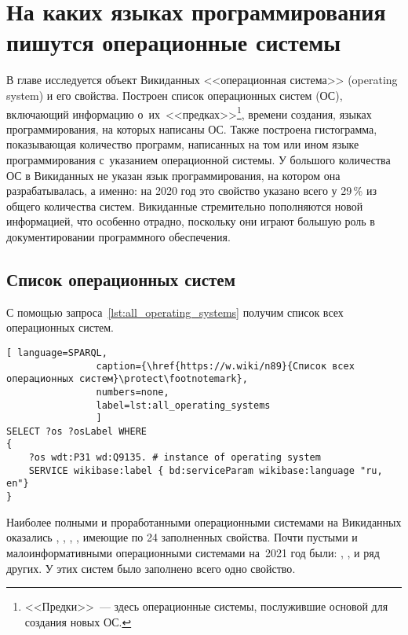 \chapter{На каких языках программирования пишутся операционные системы}
\label{ch:operating-sysmets}

В главе исследуется объект Викиданных <<операционная система>> (operating system) и его свойства. 
Построен список операционных систем (ОС), включающий информацию о~их~<<предках>>\footnote{%
%
<<Предки>>~--- здесь операционные системы, послужившие основой для создания новых ОС.%
%
}, 
времени создания, языках программирования, на которых написаны ОС. 
Также построена гистограмма, показывающая количество программ, 
написанных на том или ином языке программирования с~указанием операционной системы. 
У большого количества ОС в Викиданных не указан язык программирования, 
на котором она разрабатывалась, а именно: 
на 2020 год это свойство указано всего у 29\,\% из общего количества систем. 
Викиданные стремительно пополняются новой информацией, что особенно отрадно, 
поскольку они играют большую роль в документировании программного обеспечения.



\section{Список операционных систем}
С помощью запроса~\ref{lst:all_operating_systems} получим список всех операционных систем.
\begin{lstlisting}[ language=SPARQL, 
                caption={\href{https://w.wiki/n89}{Список всех операционных систем}\protect\footnotemark},
                numbers=none,
                label=lst:all_operating_systems
	            ]
SELECT ?os ?osLabel WHERE
{
    ?os wdt:P31 wd:Q9135. # instance of operating system
    SERVICE wikibase:label { bd:serviceParam wikibase:language "ru, en"}
}
\end{lstlisting}


\newpage
Наиболее полными и проработанными операционными системами на Викиданных оказались 
, 
, 
, 
, имеющие по 24 заполненных свойства\autocite{prowd_os_link}.
Почти пустыми и малоинформативными операционными системами на~2021 год были: 
, ,  и ряд других. 
У этих систем было заполнено всего одно свойство\autocite{prowd_os_link}.

